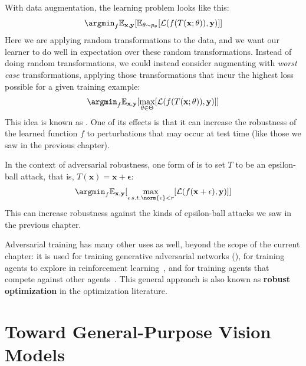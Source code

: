 With data augmentation, the learning problem looks like this:
\begin{align}
    \argmin_f \mathbb{E}_{\mathbf{x},\mathbf{y}} [\mathbb{E}_{\theta \sim p_{\theta}}[\mathcal{L}(f(T(\mathbf{x};\theta)),\mathbf{y})]]
\end{align}
Here we are applying random transformations to the data, and we want our learner to do well in expectation over these random transformations. Instead of doing random transformations, we could instead consider augmenting with \textit{worst case} transformations, applying those transformations that incur the highest loss possible for a given training example:
\begin{align}
    \argmin_f \mathbb{E}_{\mathbf{x},\mathbf{y}} [\max_{\theta \in \Theta}[\mathcal{L}(f(T(\mathbf{x};\theta)),\mathbf{y})]] \label{eqn:data_augmentation:adversarial_training}
\end{align}
This idea is known as . One of its effects is that it can increase the robustness of the learned function $f$ to perturbations that may occur at test time (like those we saw in the previous chapter).

In the context of adversarial robustness, one form of \eqn{\ref{eqn:data_augmentation:adversarial_training}} is to set $T$ to be an epsilon-ball attack, that is, $T(\mathbf{x}) = \mathbf{x}+\mathbf{\epsilon}$:
\begin{align}
    \argmin_f \mathbb{E}_{\mathbf{x},\mathbf{y}} [\max_{\mathbf{\epsilon} \, s.t. \norm{\mathbf{\epsilon}} < r}[\mathcal{L}(f(\mathbf{x}+\mathbf{\epsilon}),\mathbf{y})]] \label{eqn:data_augmentation:eps_robust_training}
\end{align}
This can increase robustness against the kinds of epsilon-ball attacks we saw in the previous chapter.

Adversarial training has many other uses as well, beyond the scope of the current chapter: it is used for training generative adversarial networks (\chap{\ref{chapter:generative_models}}), for training agents to explore in reinforcement learning~\cite{pathak2017curiosity}, and for training agents that compete against other agents~\cite{silver2016mastering}. This general approach is also known as \textbf{robust optimization} in the optimization literature.

\section{Toward General-Purpose Vision Models}

